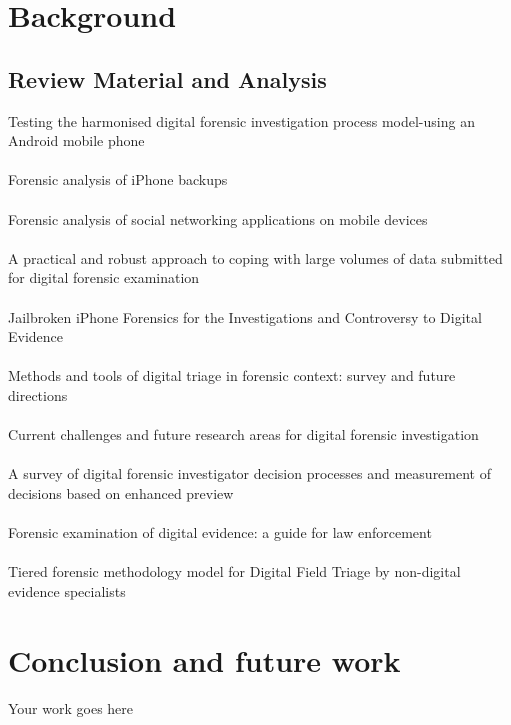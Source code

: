 \documentclass[12pt]{article}
\begin{document}
\newpage
\section{Background}
\label{sect-background}

\subsection{Review Material and Analysis}
Testing the harmonised digital forensic investigation process model-using an Android mobile phone \cite{omeleze2013testing}\\
\\

Forensic analysis of iPhone backups \cite{satishforensic}\\
\\
Forensic analysis of social networking applications on mobile devices \cite{al2012forensic}\\
\\
A practical and robust approach to coping with large volumes of data submitted for digital forensic examination \cite{shaw2013practical}\\
\\
Jailbroken iPhone Forensics for the Investigations and Controversy to Digital Evidence \cite{chang2015jailbroken}\\
\\
Methods and tools of digital triage in forensic context: survey and future directions \cite{jusas2017methods}\\
\\
Current challenges and future research areas for digital forensic investigation \cite{lillis2016current}\\
\\
A survey of digital forensic investigator decision processes and measurement of decisions based on enhanced preview \cite{james2013survey}\\
\\
Forensic examination of digital evidence: a guide for law enforcement \cite{hart2004forensic}\\
\\
Tiered forensic methodology model for Digital Field Triage by non-digital evidence specialists \cite{hitchcock2016tiered}

\newpage
\section{Conclusion and future work}
\label{sect-conclusion}

Your work goes here

\newpage


\end{document}
